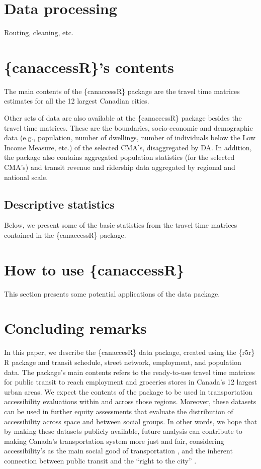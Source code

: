 \documentclass[Royal,times,sageh]{sagej}
\begin{document}
\section{Data processing}\label{data-processing}

Routing, cleaning, etc.

\section{\{canaccessR\}'s contents}\label{canaccessrs-contents}

The main contents of the \{canaccessR\} package are the travel time
matrices estimates for all the 12 largest Canadian cities.

Other sets of data are also available at the \{canaccessR\} package
besides the travel time matrices. These are the boundaries,
socio-economic and demographic data (e.g., population, number of
dwellings, number of individuals below the Low Income Measure, etc.) of
the selected CMA's, disaggregated by DA. In addition, the package also
contains aggregated population statistics (for the selected CMA's) and
transit revenue and ridership data aggregated by regional and national
scale.

\subsection{Descriptive statistics}\label{descriptive-statistics}

Below, we present some of the basic statistics from the travel time
matrices contained in the \{canaccessR\} package.

\section{How to use \{canaccessR\}}\label{how-to-use-canaccessr}

This section presents some potential applications of the data package.

\section{Concluding remarks}\label{concluding-remarks}

In this paper, we describe the \{canaccesR\} data package, created using
the \{r5r\} R package and transit schedule, street network, employment,
and population data. The package's main contents refers to the
ready-to-use travel time matrices for public transit to reach employment
and groceries stores in Canada's 12 largest urban areas. We expect the
contents of the package to be used in transportation accessibility
evaluations within and across those regions. Moreover, these datasets
can be used in further equity assessments that evaluate the distribution
of accessibility across space and between social groups. In other words,
we hope that by making these datasets publicly available, future
analysis can contribute to making Canada's transportation system more
just and fair, considering accessibility's as the main social good of
transportation \citep{martensTransportJusticeDesigning2016}, and the
inherent connection between public transit and the ``right to the city''
\citep{cogginRightTransportMoving2015}.
\end{document}
